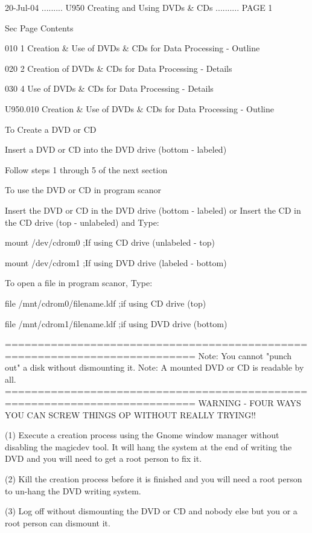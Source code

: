    20-Jul-04 ......... U950  Creating and Using DVDs & CDs .......... PAGE   1
 
 
   Sec Page Contents
 
   010   1  Creation & Use of DVDs & CDs for Data Processing - Outline
 
   020   2  Creation       of DVDs & CDs for Data Processing - Details
 
   030   4  Use            of DVDs & CDs for Data Processing - Details
 
 
   U950.010  Creation & Use of DVDs & CDs for Data Processing - Outline
 
   To Create a DVD or CD
 
   Insert a DVD or CD into the DVD drive (bottom - labeled)
 
   Follow steps 1 through 5 of the next section
 
 
   To use the DVD or CD in program scanor
 
   Insert the DVD or CD in the DVD drive (bottom - labeled)
   or
   Insert the CD in the CD drive         (top  - unlabeled)
   and Type:
 
   mount /dev/cdrom0              ;If using CD  drive (unlabeled - top)
 
   mount /dev/cdrom1              ;If using DVD drive (labeled - bottom)
 
 
   To open a file in  program scanor, Type:
 
   file /mnt/cdrom0/filename.ldf  ;if using CD  drive (top)
 
   file /mnt/cdrom1/filename.ldf  ;if using DVD drive (bottom)
 
   ===========================================================================
   Note: You cannot "punch out" a disk without dismounting it.
   Note: A mounted DVD or CD is readable by all.
   ===========================================================================
       WARNING - FOUR WAYS YOU CAN SCREW THINGS OP WITHOUT REALLY TRYING!!
 
   (1)  Execute  a  creation  process  using  the Gnome window manager without
   disabling the magicdev tool. It will hang the system at the end of  writing
   the DVD and you will need to get a root person to fix it.
 
   (2)  Kill  the  creation  process before it is finished and you will need a
   root person to un-hang the DVD writing system.
 
   (3) Log off without dismounting the DVD or CD and nobody else but you or  a
   root person can dismount it.
 

